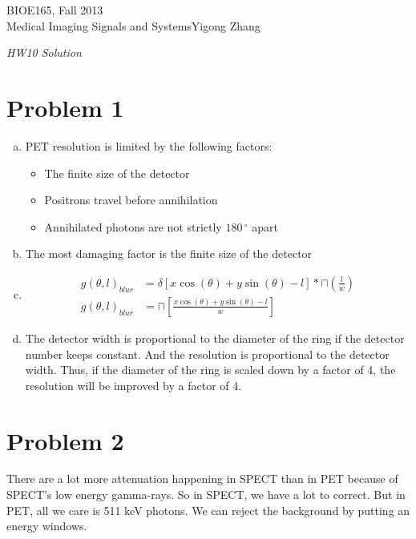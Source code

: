\documentclass[12pt]{article}
\begin{document}
{\parindent 0pt
BIOE165, Fall 2013\\
 Medical Imaging Signals and Systems\hfill Yigong Zhang \vskip 0.8in}

\begin{center}
{\Large\em HW10 Solution }\\[0.7in]
\end{center}


\section*{Problem 1}

\begin{enumerate}[a)]
\item PET resolution is limited by the following factors:
	\begin{itemize}
	\item The finite size of the detector
	\item Positrons travel before annihilation
	\item Annihilated photons are not strictly $180\,^{\circ}$ apart
	\end{itemize}
\item The most damaging factor is the finite size of the detector
\item 
\begin{align*}
g(\theta, l)_{blur} &= \delta [x \cos(\theta)+y \sin(\theta)- l] \ast \sqcap(\frac{l}{w})
\\g(\theta, l)_{blur} &=\sqcap[\frac{x \cos(\theta)+y \sin(\theta)- l}{w}]
\end{align*}

\item The detector width is proportional to the diameter of the ring if the detector number keeps constant. And the resolution is proportional to the detector width. Thus, if the diameter of the ring is scaled down by a factor of 4, the resolution will be improved by a factor of 4.
				
\end{enumerate}

\section*{Problem 2}
There are a lot more attenuation happening in SPECT than in PET because of SPECT's low energy gamma-rays. So in SPECT, we have a lot to correct. But in PET, all we care is 511 keV photons. We can reject the background by putting an energy windows.
\end{document}
